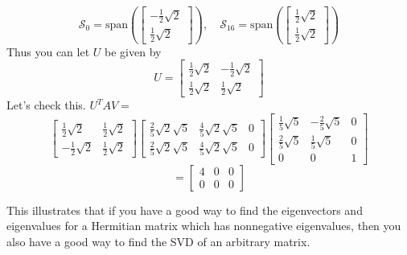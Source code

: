 \documentclass{ximera}
\begin{document}
\begin{example}
\begin{explanation}
\begin{equation*}
\mathcal{S}_0=\mbox{span}\left(\left[  
\begin{array}{c}
-\frac{1}{2}\sqrt{2} \\
\frac{1}{2}\sqrt{2}
\end{array}
\right] \right),\quad\mathcal{S}_{16}=\mbox{span}\left( \left[  
\begin{array}{c}
\frac{1}{2}\sqrt{2} \\
\frac{1}{2}\sqrt{2}
\end{array}
\right] \right) 
\end{equation*}
Thus you can let $U$ be given by
\begin{equation*}
U=\left[  
\begin{array}{cc}
\frac{1}{2}\sqrt{2} & -\frac{1}{2}\sqrt{2} \\
\frac{1}{2}\sqrt{2} & \frac{1}{2}\sqrt{2}
\end{array}
\right]
\end{equation*}
Let's check this. $U^TAV=$
\begin{equation*}
\left[  
\begin{array}{cc}
\frac{1}{2}\sqrt{2} & \frac{1}{2}\sqrt{2} \\
-\frac{1}{2}\sqrt{2} & \frac{1}{2}\sqrt{2}
\end{array}
\right] \left[   
\begin{array}{ccc}
\frac{2}{5}\sqrt{2}\sqrt{5} & \frac{4}{5}\sqrt{2}\sqrt{5} & 0 \\
\frac{2}{5}\sqrt{2}\sqrt{5} & \frac{4}{5}\sqrt{2}\sqrt{5} & 0
\end{array}
\right] \left[ 
\begin{array}{ccc}
\frac{1}{5}\sqrt{5} & -\frac{2}{5}\sqrt{5} & 0 \\
\frac{2}{5}\sqrt{5} & \frac{1}{5}\sqrt{5} & 0 \\
0 & 0 & 1
\end{array}
\right]
\end{equation*}
\begin{equation*}
=\left[
\begin{array}{ccc}
4 & 0 & 0 \\
0 & 0 & 0
\end{array}
\right]
\end{equation*}
\end{explanation}
\end{example}

This illustrates that if you have a good way to find the eigenvectors and
eigenvalues for a Hermitian matrix which has nonnegative eigenvalues, then
you also have a good way to find the SVD of an
arbitrary matrix.
\end{document}
